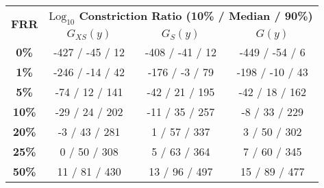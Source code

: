 \begin{tabular}{c c c c}
\toprule
\multirow{2}{*}{\textbf{FRR }} & \multicolumn{3}{c}{\textbf{$\text{Log}_{10}$ Constriction Ratio (10\% / Median / 90\%)}} \\
\cmidrule(lr){2-4}
 & \textbf{$G_{XS}(y)$} & \textbf{$G_S(y)$} & \textbf{$G(y)$} \\
\midrule
\textbf{0\%}  & -427 / -45 / 12   & -408 / -41 / 12   & -449 / -54 / 6   \\
\textbf{1\%}  & -246 / -14 / 42   & -176 / -3 / 79    & -198 / -10 / 43  \\
\textbf{5\%}  & -74 / 12 / 141    & -42 / 21 / 195    & -42 / 18 / 162   \\
\textbf{10\%} & -29 / 24 / 202    & -11 / 35 / 257    & -8 / 33 / 229    \\
\textbf{20\%} & -3 / 43 / 281     & 1 / 57 / 337      & 3 / 50 / 302     \\
\textbf{25\%} & 0 / 50 / 308      & 5 / 63 / 364      & 7 / 60 / 345     \\
\textbf{50\%} & 11 / 81 / 430     & 13 / 96 / 497     & 15 / 89 / 477    \\
\bottomrule
\end{tabular}
